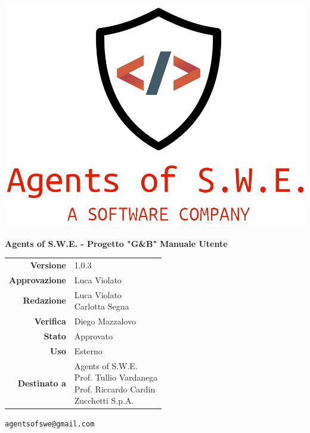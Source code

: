 


\begin{titlepage}
\thispagestyle{empty}

\begin{center}

\includegraphics[scale=0.3]{./images/logo.png} 

\large \textbf{Agents of S.W.E. - Progetto "G\&B"}
\vfill
\Huge \textbf{Manuale Utente}
\vfill
\large
\renewcommand{\arraystretch}{1.3}
\begin{tabular}{r|l}
\textbf{Versione} & 1.0.3\\
\textbf{Approvazione} & Luca Violato\\
\textbf{Redazione} & \parbox[t]{5cm}{Luca Violato\\Carlotta Segna}\\
\textbf{Verifica} & \parbox[t]{5cm}{Diego Mazzalovo}\\
\textbf{Stato} & Approvato\\
\textbf{Uso} & Esterno\\
\textbf{Destinato a} & \parbox[t]{5cm}{Agents of S.W.E. \\Prof. Tullio Vardanega\\Prof. Riccardo Cardin \\ Zucchetti S.p.A.}
\end{tabular}
\vfill
\small
\texttt{agentsofswe@gmail.com}
\end{center}
\end{titlepage}

\pagebreak


